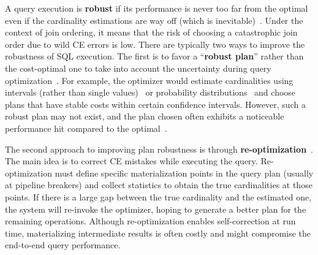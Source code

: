

A query execution is \textbf{robust} if its performance is never too far from the optimal even if the cardinality estimations are way off (which is inevitable)~\cite{2019tutorial_robust, robustoptimization}. Under the context of join ordering, it means that the risk of choosing a catastrophic join order due to wild CE errors is low. There are typically two ways to improve the robustness of SQL execution. The first is to favor a ``\textbf{robust plan}'' rather than the cost-optimal one to take into account the uncertainty during query optimization~\cite{2002LEC, 2005RCE, 2007plan_diagram, 2008strict_plan_diagram}. For example, the optimizer would estimate cardinalities using intervals (rather than single values)~\cite{proactive} or probability distributions~\cite{2005RCE} and choose plans that have stable costs within certain confidence intervals. However, such a robust plan may not exist, and the plan chosen often exhibits a noticeable performance hit compared to the optimal~\cite{robustoptimization}.

The second approach to improving plan robustness is through \textbf{re-optimization}~\cite{1998reopt, 1999reopt_shared_nothing, 2000eddies, 2004pop, 2007pop_parallel, 2016planbouquets, Perron19, 2023reopt_zhao, justen2024polar}.
The main idea is to correct CE mistakes while executing the query. Re-optimization must define specific materialization points in the query plan (usually at pipeline breakers) and collect statistics to obtain the true cardinalities at those points. If there is a large gap between the true cardinality and the estimated one, the system will re-invoke the optimizer, hoping to generate a better plan for the remaining operations. Although re-optimization enables self-correction at run time, materializing intermediate results is often costly and might compromise the end-to-end query performance.




